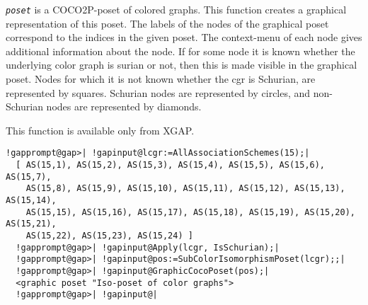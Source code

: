 \documentclass[a4paper,11pt]{report}
\begin{document}
{{{ \mbox{\texttt{\mdseries\slshape poset}} is a \textsf{COCO2P}-poset of colored graphs. This function creates a graphical representation of
this poset. The labels of the nodes of the graphical poset correspond to the
indices in the given poset. The context-menu of each node gives additional
information about the node. If for some node it is known whether the
underlying color graph is surian or not, then this is made visible in the
graphical poset. Nodes for which it is not known whether the cgr is Schurian,
are represented by squares. Schurian nodes are represented by circles, and
non-Schurian nodes are represented by diamonds. 

 This function is available only from \textsf{XGAP}. 
\begin{Verbatim}[commandchars=!@|,fontsize=\small,frame=single,label=Example]
  !gapprompt@gap>| !gapinput@lcgr:=AllAssociationSchemes(15);|
  [ AS(15,1), AS(15,2), AS(15,3), AS(15,4), AS(15,5), AS(15,6), AS(15,7), 
    AS(15,8), AS(15,9), AS(15,10), AS(15,11), AS(15,12), AS(15,13), AS(15,14), 
    AS(15,15), AS(15,16), AS(15,17), AS(15,18), AS(15,19), AS(15,20), AS(15,21), 
    AS(15,22), AS(15,23), AS(15,24) ]
  !gapprompt@gap>| !gapinput@Apply(lcgr, IsSchurian);|
  !gapprompt@gap>| !gapinput@pos:=SubColorIsomorphismPoset(lcgr);;|
  !gapprompt@gap>| !gapinput@GraphicCocoPoset(pos);|
  <graphic poset "Iso-poset of color graphs">
  !gapprompt@gap>| !gapinput@|
  	    
\end{Verbatim}
 }

 }

 }

 
\end{document}
